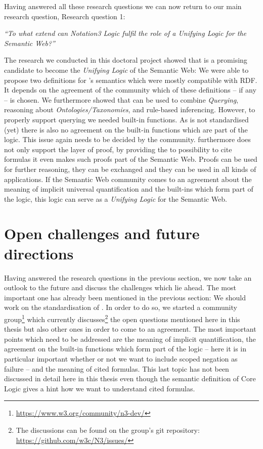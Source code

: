 Having answered all these research questions we can now return to our main research question, Research question 1:

\textit{ 
``To what extend can Notation3 Logic fulfil the role of a \emph{Unifying Logic} for the Semantic Web?''
}

The research we conducted in this doctoral project showed that \nthreelogic is a promising candidate to become the \emph{Unifying Logic} of the Semantic Web:
We were able to propose two definitions for \nthree's semantics which were mostly compatible with RDF. It depends on the agreement of the community which 
of these definitions -- if any -- is chosen.
We furthermore showed that \nthree can be used to combine \emph{Querying}, reasoning about \emph{Ontologies/Taxonomies}, and rule-based inferencing. 
However, to properly support querying we  needed 
built-in functions. As \nthree is not standardised (yet) there is also no agreement on the built-in functions which are part of the logic. This  issue again 
needs to be decided by the community. 
\nthree  furthermore does not only support the layer of proof, by providing the to possibility to cite formulas it even makes such proofs part of the Semantic Web.
Proofs can be used for further reasoning, they can be exchanged and they can be used in all kinds of applications.
If the Semantic Web community comes to an agreement about the meaning of implicit universal quantification and the built-ins which form part of the logic, this logic 
can serve as a \emph{Unifying Logic} for the Semantic Web.




\section{Open challenges and future directions}
Having answered the research questions in the previous section, we now take an outlook to the future and discuss the challenges which lie ahead. The most important one 
has already been mentioned in the previous section: We should work on the standardisation of \nthree. In order to do so, we started a 
\wwwc community group\footnote{\url{https://www.w3.org/community/n3-dev/}} which currently 
discusses\footnote{The discussions can be found on the group's git repository: \url{https://github.com/w3c/N3/issues/}} the open questions mentioned here in this thesis but also other ones 
in order to come to an agreement. The most important points which need to be addressed are the meaning of implicit quantification, the agreement on the 
built-in functions which form part of the logic -- here it is in particular important whether or not we want to include scoped negation as failure -- and 
the meaning of cited formulas. This last topic has not been discussed in detail here in this thesis even though the semantic definition of \nthree Core Logic gives a hint
how we want to understand cited formulas. 


